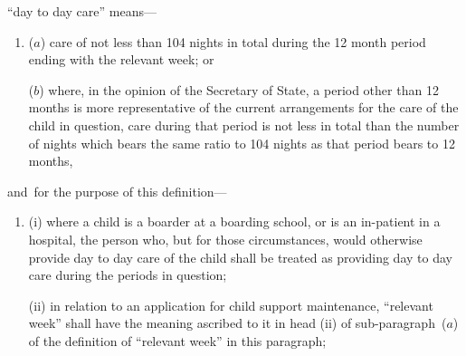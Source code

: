 \documentclass[12pt,a4paper]{article}
\begin{document}
\begin{enumerate}
%

“day to day care” means—
\begin{enumerate}\item[]
($a$) care of not less than 104 nights in total during the 12 month period ending with the relevant week; or

($b$) where, in the opinion of the 
Secretary of State, a period other than 12 months  %
is more representative of the current arrangements for the care of the child in question, care during that period is not less in total than the number of nights which bears the same ratio to 104 nights as that period bears to 12 months,
\end{enumerate}
and~for the purpose of this definition—
\begin{enumerate}\item[]
(i) where a child is a boarder at a boarding school, or is an in-patient in a hospital, the person who, but for those circumstances, would otherwise provide day to day care of the child shall be treated as providing day to day care during the periods in question;


(ii) in relation to an application for child support maintenance, “relevant week” shall have the meaning ascribed to it in head (ii) of sub-paragraph~($a$) of the definition of “relevant week” in this paragraph;


\end{enumerate}
\end{enumerate}
\end{document}
